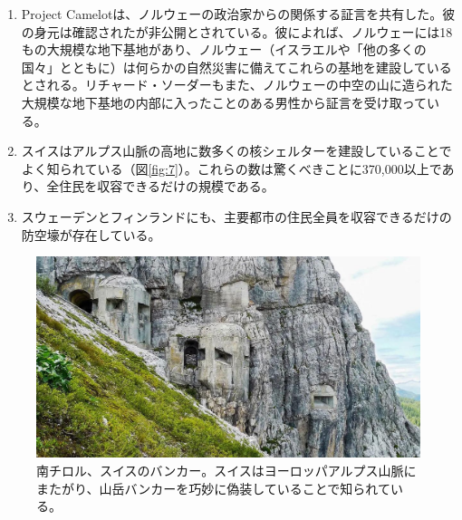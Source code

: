 \documentclass[10pt,twocolumn,letterpaper]{article}
\begin{document}
\begin{flushleft}
\begin{enumerate}
    \item Project Camelotは、ノルウェーの政治家からの関係する証言を共有した\cite{25,26}。彼の身元は確認されたが非公開とされている。彼によれば、ノルウェーには18もの大規模な地下基地があり、ノルウェー（イスラエルや「他の多くの国々」とともに）は何らかの自然災害に備えてこれらの基地を建設しているとされる。リチャード・ソーダーもまた、ノルウェーの中空の山に造られた大規模な地下基地の内部に入ったことのある男性から証言を受け取っている\cite{22}。
    \item スイスはアルプス山脈の高地に数多くの核シェルターを建設していることでよく知られている（図\ref{fig:7}）。これらの数は驚くべきことに370,000以上であり、全住民を収容できるだけの規模である\cite{27}。
    \item スウェーデンとフィンランドにも、主要都市の住民全員を収容できるだけの防空壕が存在している\cite{27}。
\end{enumerate}
\end{flushleft}

\begin{figure}[t]
\begin{center}
   \includegraphics[width=1\linewidth]{tyrol.jpg}
\end{center}
   \caption{南チロル、スイスのバンカー。スイスはヨーロッパアルプス山脈にまたがり、山岳バンカーを巧妙に偽装していることで知られている\cite{32}。}
\label{fig:7}
\label{fig:onecol}
\end{figure}
\end{document}
